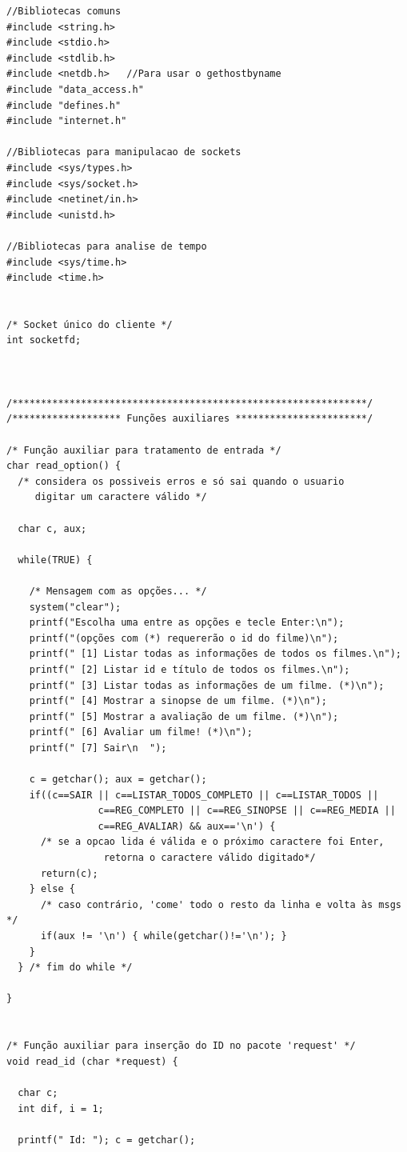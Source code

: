 \documentclass[11pt,twoside]{article}
\begin{document}
\begin{verbatim}
//Bibliotecas comuns
#include <string.h>
#include <stdio.h>
#include <stdlib.h>
#include <netdb.h>   //Para usar o gethostbyname
#include "data_access.h"
#include "defines.h"
#include "internet.h"

//Bibliotecas para manipulacao de sockets
#include <sys/types.h>
#include <sys/socket.h>
#include <netinet/in.h>
#include <unistd.h>

//Bibliotecas para analise de tempo
#include <sys/time.h>
#include <time.h>


/* Socket único do cliente */
int socketfd;



/**************************************************************/
/******************* Funções auxiliares ***********************/

/* Função auxiliar para tratamento de entrada */
char read_option() {
  /* considera os possiveis erros e só sai quando o usuario
     digitar um caractere válido */
  
  char c, aux;
  
  while(TRUE) {
    
    /* Mensagem com as opções... */
    system("clear");
    printf("Escolha uma entre as opções e tecle Enter:\n");
    printf("(opções com (*) requererão o id do filme)\n");
    printf(" [1] Listar todas as informações de todos os filmes.\n");
    printf(" [2] Listar id e título de todos os filmes.\n");
    printf(" [3] Listar todas as informações de um filme. (*)\n");
    printf(" [4] Mostrar a sinopse de um filme. (*)\n");
    printf(" [5] Mostrar a avaliação de um filme. (*)\n");
    printf(" [6] Avaliar um filme! (*)\n");
    printf(" [7] Sair\n  ");

    c = getchar(); aux = getchar();
    if((c==SAIR || c==LISTAR_TODOS_COMPLETO || c==LISTAR_TODOS ||
				c==REG_COMPLETO || c==REG_SINOPSE || c==REG_MEDIA ||
				c==REG_AVALIAR) && aux=='\n') {
      /* se a opcao lida é válida e o próximo caractere foi Enter, 
				 retorna o caractere válido digitado*/
      return(c);
    } else {
      /* caso contrário, 'come' todo o resto da linha e volta às msgs */
      if(aux != '\n') { while(getchar()!='\n'); }
    }
  } /* fim do while */

}


/* Função auxiliar para inserção do ID no pacote 'request' */
void read_id (char *request) {

  char c;
  int dif, i = 1;

  printf(" Id: "); c = getchar();


\end{verbatim}
\end{document}
